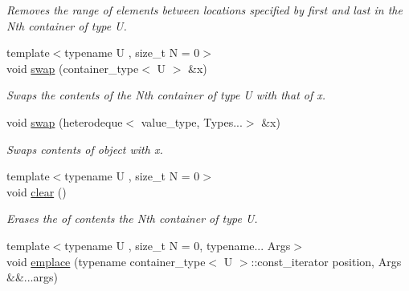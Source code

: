 \begin{DoxyCompactItemize}
\begin{DoxyCompactList}\small\item\em Removes the range of elements between locations specified by first and last in the Nth container of type U. \end{DoxyCompactList}\item 
\hypertarget{classheterogeneous_1_1heterodeque_3_01_t_00_01_types_8_8_8_4_a57399e8b403886fc095af9d415758be9}{}{\footnotesize template$<$typename U , size\+\_\+t N = 0$>$ }\\void \hyperlink{classheterogeneous_1_1heterodeque_3_01_t_00_01_types_8_8_8_4_a57399e8b403886fc095af9d415758be9}{swap} (container\+\_\+type$<$ U $>$ \&x)\label{classheterogeneous_1_1heterodeque_3_01_t_00_01_types_8_8_8_4_a57399e8b403886fc095af9d415758be9}

\begin{DoxyCompactList}\small\item\em Swaps the contents of the Nth container of type U with that of x. \end{DoxyCompactList}\item 
\hypertarget{classheterogeneous_1_1heterodeque_3_01_t_00_01_types_8_8_8_4_a3f1a58332e50a4451035d9bbd74accba}{}void \hyperlink{classheterogeneous_1_1heterodeque_3_01_t_00_01_types_8_8_8_4_a3f1a58332e50a4451035d9bbd74accba}{swap} (heterodeque$<$ value\+\_\+type, Types...$>$ \&x)\label{classheterogeneous_1_1heterodeque_3_01_t_00_01_types_8_8_8_4_a3f1a58332e50a4451035d9bbd74accba}

\begin{DoxyCompactList}\small\item\em Swaps contents of object with x. \end{DoxyCompactList}\item 
\hypertarget{classheterogeneous_1_1heterodeque_3_01_t_00_01_types_8_8_8_4_adcdf9687744d99118915889ff4ee77c1}{}{\footnotesize template$<$typename U , size\+\_\+t N = 0$>$ }\\void \hyperlink{classheterogeneous_1_1heterodeque_3_01_t_00_01_types_8_8_8_4_adcdf9687744d99118915889ff4ee77c1}{clear} ()\label{classheterogeneous_1_1heterodeque_3_01_t_00_01_types_8_8_8_4_adcdf9687744d99118915889ff4ee77c1}

\begin{DoxyCompactList}\small\item\em Erases the of contents the Nth container of type U. \end{DoxyCompactList}\item 
\hypertarget{classheterogeneous_1_1heterodeque_3_01_t_00_01_types_8_8_8_4_ace1489f407a6571872608990892ef8f5}{}{\footnotesize template$<$typename U , size\+\_\+t N = 0, typename... Args$>$ }\\void \hyperlink{classheterogeneous_1_1heterodeque_3_01_t_00_01_types_8_8_8_4_ace1489f407a6571872608990892ef8f5}{emplace} (typename container\+\_\+type$<$ U $>$\+::const\+\_\+iterator position, Args \&\&...args)\label{classheterogeneous_1_1heterodeque_3_01_t_00_01_types_8_8_8_4_ace1489f407a6571872608990892ef8f5}


\end{DoxyCompactItemize}
